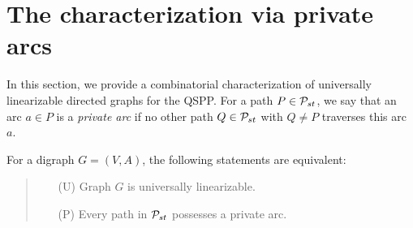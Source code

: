 \documentclass[runningheads]{llncs}
\begin{document}
\section{The characterization via private arcs}
\label{sec:private}
In this section, we provide a combinatorial characterization of universally linearizable 
directed graphs for the QSPP.
For a path $P\in{\cal P}_{st}$, we say that an arc $a\in P$ is a \emph{private arc} if no other 
path $Q\in{\cal P}_{st}$ with $Q\ne P$ traverses this arc $a$.
\begin{theorem}
\label{th:private}
For a digraph $G=(V,A)$, the following statements are equivalent:
\begin{quote}
\begin{itemize}
\item[(U)] Graph $G$ is universally linearizable.
\item[(P)] Every path in ${\cal P}_{st}$ possesses a private arc.
\end{itemize}
\end{quote}
\end{theorem}
\end{document}

